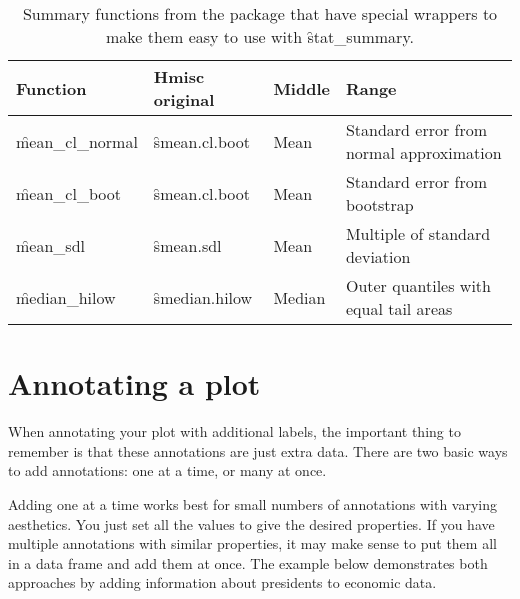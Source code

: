 % 


\begin{table}
  \begin{center}
  \begin{tabular}{lllp{2in}}
    \toprule
    Function & Hmisc original & Middle & Range \\
    \midrule 
    \f{mean_cl_normal} & \f{smean.cl.boot} & 
      Mean & Standard error from normal approximation \\
    \f{mean_cl_boot} & \f{smean.cl.boot} & 
      Mean & Standard error from bootstrap \\
    \f{mean_sdl} & \f{smean.sdl} & 
      Mean & Multiple of standard deviation  \\
    \f{median_hilow} & \f{smedian.hilow}  & 
      Median & Outer quantiles with equal tail areas \\
    \bottomrule
  \end{tabular}
  \end{center}
  \caption{Summary functions from the  package that have special wrappers to make them easy to use with \f{stat_summary}.}
  \label{tbl:hmisc}
\end{table}

\section{Annotating a plot}
\label{sec:annotating}

When annotating your plot with additional labels, the important thing to remember is that these annotations are just extra data.  There are two basic ways to add annotations: one at a time, or many at once. 

Adding one at a time works best for small numbers of annotations with varying aesthetics. You just set all the values to give the desired properties. If you have multiple annotations with similar properties, it may make sense to put them all in a data frame and add them at once. The example below demonstrates both approaches by adding information about presidents to economic data. 

